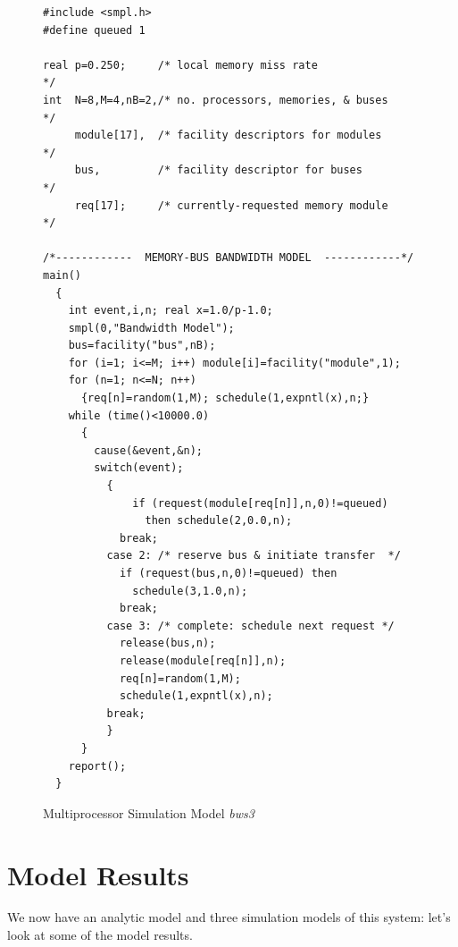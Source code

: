 \begin{figure}[p]
\centering
\begin{minipage}{.98\textwidth}
\begin{lstlisting}[basicstyle=\ttfamily\scriptsize]
#include <smpl.h>
#define queued 1

real p=0.250;     /* local memory miss rate                */
int  N=8,M=4,nB=2,/* no. processors, memories, & buses     */
     module[17],  /* facility descriptors for modules      */
     bus,         /* facility descriptor for buses         */
     req[17];     /* currently-requested memory module     */

/*------------  MEMORY-BUS BANDWIDTH MODEL  ------------*/
main()
  {
    int event,i,n; real x=1.0/p-1.0;
    smpl(0,"Bandwidth Model");
    bus=facility("bus",nB);
    for (i=1; i<=M; i++) module[i]=facility("module",1);
    for (n=1; n<=N; n++)
      {req[n]=random(1,M); schedule(1,expntl(x),n;}
    while (time()<10000.0)
      {
        cause(&event,&n);
        switch(event);
          {
              if (request(module[req[n]],n,0)!=queued)
                then schedule(2,0.0,n);
            break;
          case 2: /* reserve bus & initiate transfer  */
            if (request(bus,n,0)!=queued) then
              schedule(3,1.0,n);
            break;
          case 3: /* complete: schedule next request */
            release(bus,n);
            release(module[req[n]],n);
            req[n]=random(1,M);
            schedule(1,expntl(x),n);
          break;
          }
      }
    report();
  }
\end{lstlisting}
\end{minipage}
\caption{Multiprocessor Simulation Model \emph{bws3}}
\end{figure}

\section{Model Results}

We now have an analytic model and three simulation models of this
system: let's look at some of the model results.

